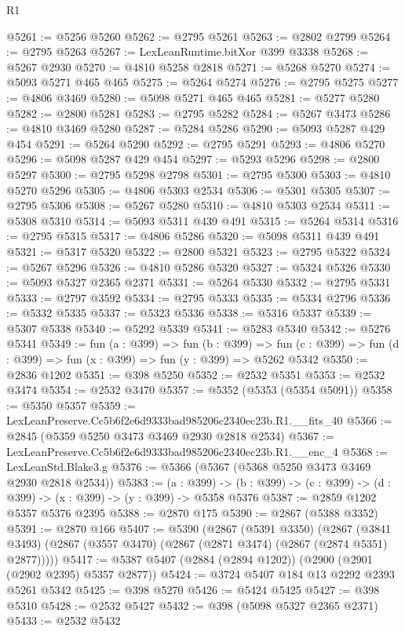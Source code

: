 \begin{lexlean}{R1}
\begin{coremodule}
@5261 := @5256 @5260
@5262 := @2795 @5261
@5263 := @2802 @2799
@5264 := @2795 @5263
@5267 := LexLeanRuntime.bitXor @399 @3338
@5268 := @5267 @2930
@5270 := @4810 @5258 @2818
@5271 := @5268 @5270
@5274 := @5093 @5271 @465 @465
@5275 := @5264 @5274
@5276 := @2795 @5275
@5277 := @4806 @3469
@5280 := @5098 @5271 @465 @465
@5281 := @5277 @5280
@5282 := @2800 @5281
@5283 := @2795 @5282
@5284 := @5267 @3473
@5286 := @4810 @3469 @5280
@5287 := @5284 @5286
@5290 := @5093 @5287 @429 @454
@5291 := @5264 @5290
@5292 := @2795 @5291
@5293 := @4806 @5270
@5296 := @5098 @5287 @429 @454
@5297 := @5293 @5296
@5298 := @2800 @5297
@5300 := @2795 @5298 @2798
@5301 := @2795 @5300
@5303 := @4810 @5270 @5296
@5305 := @4806 @5303 @2534
@5306 := @5301 @5305
@5307 := @2795 @5306
@5308 := @5267 @5280
@5310 := @4810 @5303 @2534
@5311 := @5308 @5310
@5314 := @5093 @5311 @439 @491
@5315 := @5264 @5314
@5316 := @2795 @5315
@5317 := @4806 @5286
@5320 := @5098 @5311 @439 @491
@5321 := @5317 @5320
@5322 := @2800 @5321
@5323 := @2795 @5322
@5324 := @5267 @5296
@5326 := @4810 @5286 @5320
@5327 := @5324 @5326
@5330 := @5093 @5327 @2365 @2371
@5331 := @5264 @5330
@5332 := @2795 @5331
@5333 := @2797 @3592
@5334 := @2795 @5333
@5335 := @5334 @2796
@5336 := @5332 @5335
@5337 := @5323 @5336
@5338 := @5316 @5337
@5339 := @5307 @5338
@5340 := @5292 @5339
@5341 := @5283 @5340
@5342 := @5276 @5341
@5349 := fun (a : @399) =>
  fun (b : @399) =>
  fun (c : @399) => fun (d : @399) => fun (x : @399) => fun (y : @399) => @5262 @5342
@5350 := @2836 @1202
@5351 := @398 @5250
@5352 := @2532 @5351
@5353 := @2532 @3474
@5354 := @2532 @3470
@5357 := @5352 (@5353 (@5354 @5091))
@5358 := @5350 @5357
@5359 := LexLeanPreserve.Cc5b6f2e6d9333bad985206c2340ec23b.R1.__fits_40
@5366 := @2845 (@5359 @5250 @3473 @3469 @2930 @2818 @2534)
@5367 := LexLeanPreserve.Cc5b6f2e6d9333bad985206c2340ec23b.R1.__enc_4
@5368 := LexLeanStd.Blake3.g
@5376 := @5366 (@5367 (@5368 @5250 @3473 @3469 @2930 @2818 @2534))
@5383 := (a : @399) ->
  (b : @399) -> (c : @399) -> (d : @399) -> (x : @399) -> (y : @399) -> @5358 @5376
@5387 := @2859 @1202 @5357 @5376 @2395
@5388 := @2870 @175
@5390 := @2867 (@5388 @3352)
@5391 := @2870 @166
@5407 := @5390
    (@2867
      (@5391 @3350)
      (@2867 (@3841 @3493) (@2867 (@3557 @3470) (@2867 (@2871 @3474) (@2867 (@2874 @5351) @2877)))))
@5417 := @5387 @5407 (@2884 (@2894 @1202)) (@2900 (@2901 (@2902 @2395) @5357 @2877))
@5424 := @3724 @5407 @184 @13 @2292 @2393 @5261 @5342
@5425 := @398 @5270
@5426 := @5424 @5425
@5427 := @398 @5310
@5428 := @2532 @5427
@5432 := @398 (@5098 @5327 @2365 @2371)
@5433 := @2532 @5432

\end{coremodule}
\end{lexlean}
